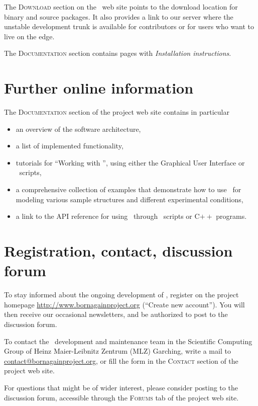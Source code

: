 The \textsc{Download} section on the \BornAgain\ web site
points to the download location for
binary and source packages.
It also provides a link to our  server
where the unstable development trunk is available
for contributors or for users who want to live on the edge.

The \textsc{Documentation} section contains
pages with \textit{Installation instructions}.


\section{Further online information}

The \textsc{Documentation} section of the project web site
contains in particular
\begin{itemize}
\item an overview of the software architecture,
\item a list of implemented functionality,
\item tutorials for ``Working with \BornAgain'',
      using either the Graphical User Interface or
      \Python\ scripts,
\item a comprehensive collection of examples that demonstrate
   how to use \BornAgain\ for modeling various sample structures
    and different experimental conditions,
\item a link to the API reference for using \BornAgain\ through
   \Python\ scripts or C$++$ programs.
%
%
%
\end{itemize}


\section{Registration, contact, discussion forum}

To stay informed about the ongoing development of \BornAgain,
register on the project homepage \url{http://www.bornagainproject.org}
(``Create new account'').
You will then receive our occasional newsletters,
and be authorized to post to the discussion forum.

To contact the \BornAgain\ development and maintenance team
in the Scientific Computing Group
of Heinz Maier-Leibnitz Zentrum (MLZ) Garching,
write a mail to \url{contact@bornagainproject.org},
or fill the form in the \textsc{Contact} section of the
project web site.

For questions that might be of wider interest,
please consider posting to the discussion forum,
accessible through the \textsc{Forums} tab of the project web site.
